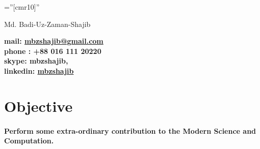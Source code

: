\documentclass[a4paper,10pt]{article}
\newcommand{\myfullname}{Md. Badi-Uz-Zaman-Shajib}
\begin{document}

\pagestyle{empty} %

\font\fb=''[cmr10]'' %

\par{\centering
		{\Huge \myfullname
	}\par}


\par{\centering
		{
		 \bf{mail}: \href{mailto:mbzshajib@gmail.com}{mbzshajib@gmail.com}\\
		 \bf{phone} : +88 016 111 20220\\
		 \bf{skype}: mbzshajib,\\
		 \bf{linkedin}: \href{https://www.linkedin.com/in/mbzshajib}{mbzshajib}\\
	}\bigskip\par}
\section*{Objective}
\paragraph{}
\textbf{Perform some extra-ordinary contribution to the Modern Science and Computation.}
\end{document}
